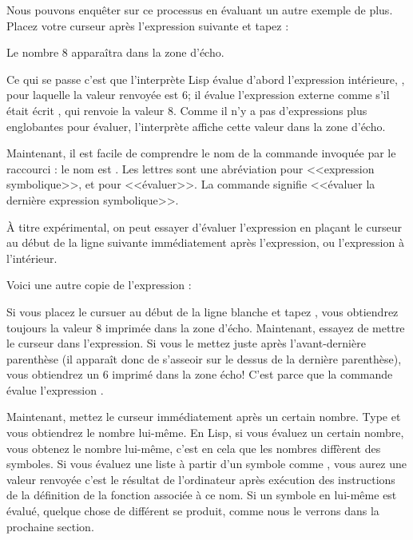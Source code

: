 Nous pouvons enquêter sur ce processus en évaluant un autre exemple de
plus. Placez votre curseur après l'expression suivante et tapez
 :
\begin{center}
\end{center}

Le nombre 8 apparaîtra dans la zone d'écho.

Ce qui se passe c'est que l'interprète Lisp évalue d'abord
l'expression intérieure, , pour laquelle la valeur
renvoyée est 6; il évalue l'expression externe comme s'il était écrit
, qui renvoie la valeur 8. Comme il n'y a pas
d'expressions plus englobantes pour évaluer, l'interprète affiche
cette valeur dans la zone d'écho.

Maintenant, il est facile de comprendre le nom de la commande invoquée
par le raccourci  : le nom est
. Les lettres  sont une abréviation pour
<<expression symbolique>>, et  pour <<évaluer>>. La commande
signifie <<évaluer la dernière expression symbolique>>.

\`A titre expérimental, on peut essayer d'évaluer l'expression en
plaçant le curseur au début de la ligne suivante immédiatement après
l'expression, ou l'expression à l'intérieur. 

Voici une autre copie de l'expression : 
\begin{center}
\end{center}

Si vous placez le cursuer au début de la ligne blanche et tapez
, vous obtiendrez toujours la valeur 8 imprimée dans
la zone d'écho. Maintenant, essayez de mettre le curseur dans
l'expression. Si vous le mettez juste après l'avant-dernière
parenthèse (il apparaît donc de s'asseoir sur le dessus de la dernière
parenthèse), vous obtiendrez un 6 imprimé dans la zone écho! C'est
parce que la commande évalue l'expression .

Maintenant, mettez le curseur immédiatement après un certain
nombre. Type  et vous obtiendrez le nombre
lui-même. En Lisp, si vous évaluez un certain nombre, vous obtenez le
nombre lui-même, c'est en cela que les nombres diffèrent des
symboles. Si vous évaluez une liste à partir d'un symbole comme
\tm{+}, vous aurez une valeur renvoyée c'est le résultat de
l'ordinateur après exécution des instructions de la définition de la
fonction associée à ce nom. Si un symbole en lui-même est évalué,
quelque chose de différent se produit, comme nous le verrons dans la
prochaine section.

